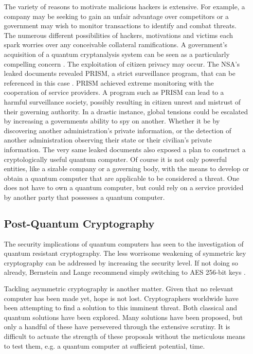 The variety of reasons to motivate malicious hackers is extensive. For example, a company may be seeking to gain an unfair advantage over competitors or a government may wish to monitor transactions to identify and combat threats. The numerous different possibilities of hackers, motivations and victims each spark worries over any conceivable collateral ramifications. A government's acquisition of a quantum cryptanalysis system can be seen as a particularly compelling concern \cite{Sec_Risk}. The exploitation of citizen privacy may occur. The NSA's leaked documents revealed PRISM, a strict surveillance program, that can be referenced in this case \cite{Sec_Risk}. PRISM achieved extreme monitoring with the cooperation of service providers. A program such as PRISM can lead to a harmful surveillance society, possibly resulting in citizen unrest and mistrust of their governing authority. In a drastic instance, global tensions could be escalated by increasing a governments ability to spy on another. Whether it be by discovering another administration's private information, or the detection of another administration observing their state or their civilian's private information. The very same leaked documents also exposed a plan to construct a cryptologically useful quantum computer.
Of course it is not only powerful entities, like a sizable company or a governing body, with the means to develop or obtain a quantum computer that are applicable to be considered a threat. One does not have to own a quantum computer, but could rely on a service provided by another party that possesses a quantum computer. 

\subsection{Post-Quantum Cryptography}
The security implications of quantum computers has seen to the investigation of quantum resistant cryptography. The less worrisome weakening of symmetric key cryptography can be addressed by increasing the security level. If not doing so already, Bernstein and Lange recommend simply switching to AES 256-bit keys \cite{Post_Q_Cryptog}. 

Tackling asymmetric cryptography is another matter.
Given that no relevant computer has been made yet, hope is not lost. 
Cryptographers worldwide have been attempting to find a solution to this imminent threat. 
Both classical and quantum solutions have been explored. Many solutions have been proposed, but only a handful of these have persevered through the extensive scrutiny.
It is difficult to actuate the strength of these proposals without the meticulous means to test them, e.g. a quantum computer at sufficient potential, time. 

